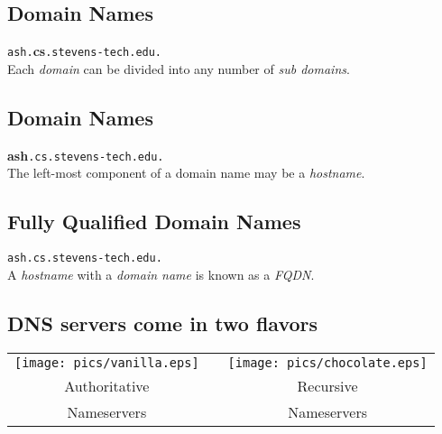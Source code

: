 \documentclass[xga]{xdvislides}
\begin{document}
\subsection{Domain Names}
\vspace{.5in}
\begin{center}
	\Huge
	\verb+ash.+{\bf cs}\verb+.stevens-tech.edu.+ \\
	\vspace{.5in}
	Each {\em domain} can be divided into any number of {\em sub domains}.
\end{center}
\Normalsize

\subsection{Domain Names}
\vspace{.5in}
\begin{center}
	\Huge
	{\bf ash}\verb+.cs.stevens-tech.edu.+ \\
	\vspace{.5in}
	The left-most component of a domain name may be a {\em hostname}.
\end{center}
\Normalsize

\subsection{Fully Qualified Domain Names}
\vspace{.5in}
\begin{center}
	\Huge
	\verb+ash.cs.stevens-tech.edu.+ \\
	\vspace{.5in}
	A {\em hostname} with a {\em domain name} is known as a {\em FQDN}.
\end{center}
\Normalsize


\subsection{DNS servers come in two flavors}
\vspace*{\fill}
\begin{center}
	\begin{tabular}{ c c c }
	\texttt{[image: pics/vanilla.eps]} & \hspace{.5in} & \texttt{[image: pics/chocolate.eps]} \\
	\hspace{.3in} \Huge Authoritative & & \hspace{.3in} \Huge Recursive \\
	\hspace{.3in} \Huge Nameservers & & \hspace{.3in} \Huge Nameservers \\
	\end{tabular}
\end{center}
\vspace*{\fill}
\end{document}
